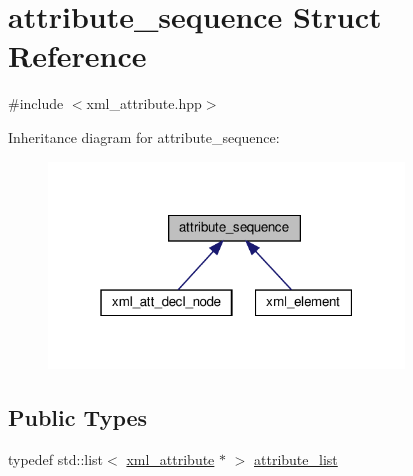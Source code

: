 \hypertarget{structattribute__sequence}{}\section{attribute\+\_\+sequence Struct Reference}
\label{structattribute__sequence}


{\ttfamily \#include $<$xml\+\_\+attribute.\+hpp$>$}



Inheritance diagram for attribute\+\_\+sequence\+:
\nopagebreak
\begin{figure}[H]
\begin{center}
\leavevmode
\includegraphics[width=268pt]{d4/d4e/structattribute__sequence__inherit__graph}
\end{center}
\end{figure}
\subsection*{Public Types}
\begin{DoxyCompactItemize}
\item 
typedef std\+::list$<$ \hyperlink{classxml__attribute}{xml\+\_\+attribute} $\ast$ $>$ \hyperlink{structattribute__sequence_ac9a1c1462a6334a140de3925dbeaae96}{attribute\+\_\+list}
\end{DoxyCompactItemize}
